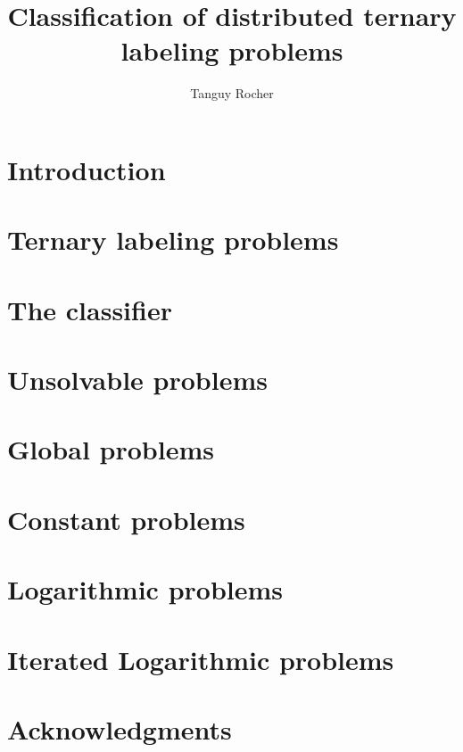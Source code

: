 
\title{Classification of distributed ternary labeling problems}
\author{Tanguy Rocher}



\maketitle

\tableofcontents
\newpage

\chapter{Introduction}


\chapter{Ternary labeling problems}


\newpage
\chapter{The classifier}


\newpage
\chapter{Unsolvable problems}



\newpage
\chapter{Global problems}


\newpage
\chapter{Constant problems}


\newpage
\chapter{Logarithmic problems}


\newpage
\chapter{Iterated Logarithmic problems}


\chapter{Acknowledgments}




